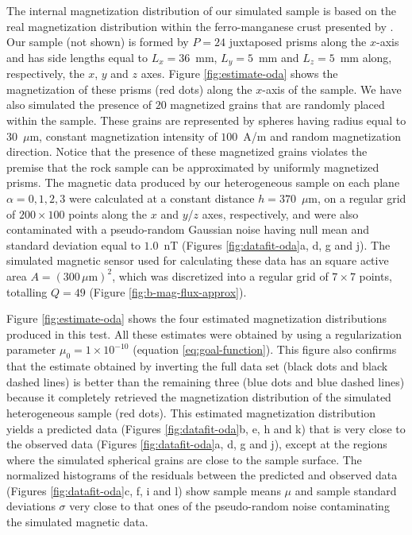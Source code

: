 \documentclass[draft,gc]{agutex}
\begin{document}
\begin{article}
The internal magnetization distribution of our simulated sample
is based on the real magnetization distribution within the
ferro-manganese crust presented by \citet{oda2011}.
Our sample (not shown) is formed by $P = 24$ juxtaposed prisms along the 
$x$-axis and has side 
lengths equal to $L_{x} = 36$~mm, $L_{y} = 5$~mm and $L_{z} = 5$~mm along, 
respectively, the $x$, $y$ and $z$ axes.
Figure \ref{fig:estimate-oda} shows the magnetization of these prisms 
(red dots) along the $x$-axis of the sample.
We have also simulated the presence of $20$ magnetized grains that 
are randomly placed within the sample.
These grains are represented by spheres having radius equal to $30$~$\mu$m,
constant magnetization intensity of $100$~A/m and random magnetization direction.
Notice that the presence of these magnetized grains violates
the premise that the rock sample can be approximated by
uniformly magnetized prisms.
The magnetic data produced by our heterogeneous sample on 
each plane $\alpha = 0, 1, 2, 3$ were calculated at a
constant distance $h = 370$~$\mu$m, on
a regular grid of $200 \times 100$ points along the $x$ and 
$y$/$z$ axes, respectively, and were also contaminated with a 
pseudo-random Gaussian noise having null mean and standard 
deviation equal to $1.0$~nT (Figures \ref{fig:datafit-oda}a,
d, g and j).
The simulated magnetic sensor used for calculating these data 
has an square active area  
$A = (300 \, \mu \text{m})^{2}$, which was discretized into
a regular grid of $7 \times 7$ points, totalling $Q = 49$
(Figure \ref{fig:b-mag-flux-approx}).

Figure \ref{fig:estimate-oda} shows the four estimated 
magnetization distributions produced in this test.
All these estimates were obtained by using a regularization
parameter $\mu_{0} = 1 \times 10^{-10}$ (equation \ref{eq:goal-function}).
This figure also confirms that the estimate
obtained by inverting the full data set (black dots and black
dashed lines) is better than the remaining three (blue dots and blue
dashed lines) because it completely retrieved the 
magnetization distribution of the simulated heterogeneous 
sample (red dots).
This estimated magnetization distribution yields a predicted data
(Figures \ref{fig:datafit-oda}b, e, h and k) that is very
close to the observed data (Figures \ref{fig:datafit-oda}a, 
d, g and j), except at the regions where the simulated spherical
grains are close to the sample surface.
The normalized histograms of the residuals between the predicted and
observed data (Figures \ref{fig:datafit-oda}c, f, i and l) show
sample means $\mu$ and sample standard deviations $\sigma$
very close to that ones of the pseudo-random noise 
contaminating the simulated magnetic data.


\end{article}
\end{document}
